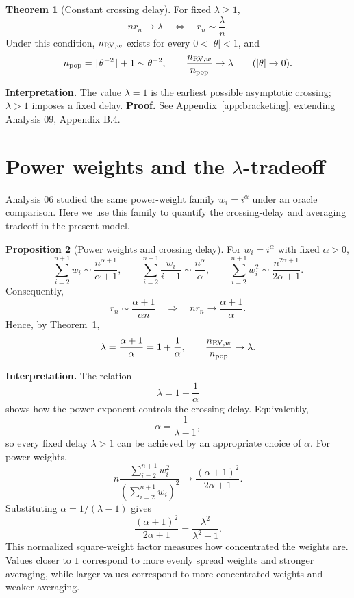 \documentclass[11pt]{article}
\theoremstyle{definition}
\newtheorem{theorem}{Theorem}[section]
\newtheorem{proposition}[theorem]{Proposition}
\begin{document}
\begin{samepage}
\begin{theorem}[Constant crossing delay]\label{thm:crossing}
For fixed $\lambda\ge1$,
\[
nr_n\to\lambda
\quad\Longleftrightarrow\quad
r_n\sim\frac{\lambda}{n}.
\]
Under this condition, $n_{{\rm RV},w}$ exists for every
$0<|\theta|<1$, and
\[
n_{\rm pop}=\lfloor\theta^{-2}\rfloor+1\sim\theta^{-2},
\qquad
\frac{n_{{\rm RV},w}}{n_{\rm pop}}\to\lambda
\qquad(|\theta|\to0).
\]
\end{theorem}
\noindent\textbf{Interpretation.} The value $\lambda=1$ is the earliest
possible asymptotic crossing; $\lambda>1$ imposes a fixed delay.
\textbf{Proof.} See Appendix~\ref{app:bracketing}, extending Analysis 09,
Appendix B.4.
\end{samepage}

\section{Power weights and the $\lambda$-tradeoff}

Analysis 06 studied the same power-weight family $w_i=i^\alpha$ under
an oracle comparison. Here we use this family to quantify the crossing-delay
and averaging tradeoff in the present model.

\begin{proposition}[Power weights and crossing delay]\label{prop:power}
For $w_i=i^\alpha$ with fixed $\alpha>0$,
\[
\sum_{i=2}^{n+1}w_i\sim\frac{n^{\alpha+1}}{\alpha+1},
\qquad
\sum_{i=2}^{n+1}\frac{w_i}{i-1}\sim\frac{n^\alpha}{\alpha},
\qquad
\sum_{i=2}^{n+1}w_i^2\sim\frac{n^{2\alpha+1}}{2\alpha+1}.
\]
Consequently,
\[
r_n\sim\frac{\alpha+1}{\alpha n}
\quad\Longrightarrow\quad nr_n\to\frac{\alpha+1}{\alpha}.
\]
Hence, by Theorem~\ref{thm:crossing},
\[
\lambda=\frac{\alpha+1}{\alpha}=1+\frac1\alpha,\qquad
\frac{n_{{\rm RV},w}}{n_{\rm pop}}\to\lambda.
\]
\end{proposition}
\noindent\textbf{Interpretation.} The relation
\[
\lambda=1+\frac1\alpha
\]
shows how the power exponent controls the crossing delay. Equivalently,
\[
\alpha=\frac1{\lambda-1},
\]
so every fixed delay $\lambda>1$ can be achieved by an appropriate
choice of $\alpha$. For power weights,
\[
n\frac{\sum_{i=2}^{n+1}w_i^2}
{\left(\sum_{i=2}^{n+1}w_i\right)^2}
\to\frac{(\alpha+1)^2}{2\alpha+1}.
\]
Substituting $\alpha=1/(\lambda-1)$ gives
\[
\frac{(\alpha+1)^2}{2\alpha+1}=\frac{\lambda^2}{\lambda^2-1}.
\]
This normalized square-weight factor measures how concentrated the
weights are. Values closer to $1$ correspond to more evenly spread
weights and stronger averaging, while larger values correspond to
more concentrated weights and weaker averaging.
\end{document}
